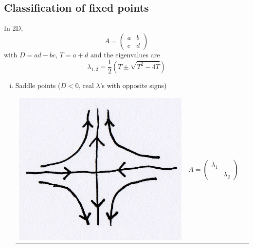 \documentclass{article}
\begin{document}
\subsection{Classification of fixed points}
In 2D, 
\[ A = \left( \begin{array}{cc}
		a & b \\
		c & d \end{array} \right) \]
with $D = ad - bc$, $T = a+d$ and the eigenvalues are
\[ \lambda_{1,2} = \frac{1}{2}(T \pm \sqrt{T^2 - 4T}) \]
\begin{enumerate}[(i)]
\item Saddle points ($D<0$, real $\lambda$'s with opposite signs)
\\
\begin{tabular}{ m{5cm} m{3cm} m{3cm}} 
\includegraphics[scale = 0.15]{fig5.png}  & 
 $ A = \left( \begin{array}{cc}
		\lambda _1 &  \\
		 & \lambda _2 \end{array} \right) $ & \makebox[5pt][l]{$ \lambda_1 < 0 <\lambda_2 $} \\
\end{tabular}


\end{enumerate}
\end{document}
